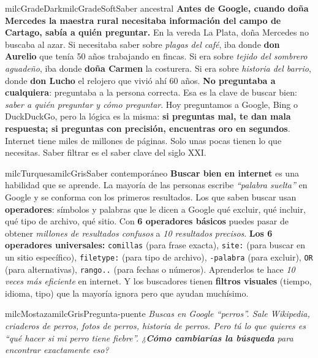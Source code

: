 \documentclass[11pt,letterpaper]{article}
\begin{document}
\begin{softbox}{milcGradeDark}{milcGradeSoft}{Saber ancestral}
\textbf{Antes de Google, cuando doña Mercedes la maestra rural necesitaba información del campo de Cartago, sabía a quién preguntar.} En la vereda La Plata, doña Mercedes no buscaba al azar. Si necesitaba saber sobre \emph{plagas del café}, iba donde \textbf{don Aurelio} que tenía 50 años trabajando en fincas. Si era sobre \emph{tejido del sombrero aguadeño}, iba donde \textbf{doña Carmen} la costurera. Si era sobre \emph{historia del barrio}, donde \textbf{don Lucho} el relojero que vivió ahí 60 años. \textbf{No preguntaba a cualquiera}: preguntaba a la persona correcta. Esa es la clave de buscar bien: \emph{saber a quién preguntar y cómo preguntar}. Hoy preguntamos a Google, Bing o DuckDuckGo, pero la lógica es la misma: \textbf{si preguntas mal, te dan mala respuesta; si preguntas con precisión, encuentras oro en segundos}. Internet tiene miles de millones de páginas. Solo unas pocas tienen lo que necesitas. Saber filtrar es el saber clave del siglo XXI.
\end{softbox}

\begin{softbox}{milcTurquesa}{milcGris}{Saber contemporáneo}
\textbf{Buscar bien en internet} es una habilidad que se aprende. La mayoría de las personas escribe \emph{``palabra suelta''} en Google y se conforma con los primeros resultados. Los que saben buscar usan \textbf{operadores}: símbolos y palabras que le dicen a Google qué excluir, qué incluir, qué tipo de archivo, qué sitio. Con \textbf{6 operadores básicos} puedes pasar de obtener \emph{millones de resultados confusos} a \emph{10 resultados precisos}. \textbf{Los 6 operadores universales:} \texttt{comillas} (para frase exacta), \texttt{site:} (para buscar en un sitio específico), \texttt{filetype:} (para tipo de archivo), \texttt{-palabra} (para excluir), \texttt{OR} (para alternativas), \texttt{rango..} (para fechas o números). Aprenderlos te hace \emph{10 veces más eficiente} en internet. Y los buscadores tienen \textbf{filtros visuales} (tiempo, idioma, tipo) que la mayoría ignora pero que ayudan muchísimo.
\end{softbox}

\begin{softbox}{milcMostaza}{milcGris}{Pregunta-puente}
\textit{Buscas en Google \emph{``perros''}. Sale Wikipedia, criaderos de perros, fotos de perros, historia de perros. Pero tú lo que quieres es \emph{``qué hacer si mi perro tiene fiebre''}. ¿\textbf{Cómo cambiarías la búsqueda} para encontrar exactamente eso?}
\end{softbox}
\end{document}
